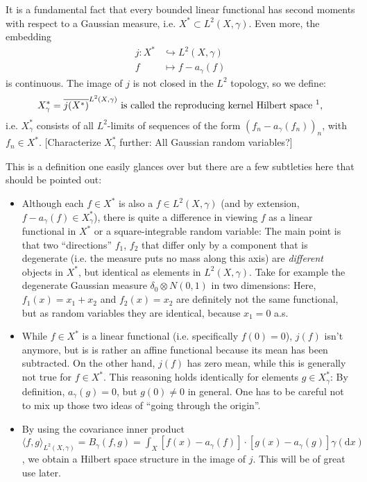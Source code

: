 \documentclass{scrartcl}
\theoremstyle{definition}
\theoremstyle{remark}
\newcommand{\de}{\mathrm d}
\newcommand{\ednote}[1]{{\color{red}[#1]}}
\begin{document}
It is a fundamental fact that every bounded linear functional has second moments with respect to a Gaussian measure, i.e. $X^*\subset L^2(X, \gamma)$. Even more, the embedding
\begin{align*}
j: X^* &\hookrightarrow L^2(X, \gamma)\\
f &\mapsto f - a_\gamma(f)
\end{align*}
is continuous. 
The image of $j$ is not closed in the $L^2$ topology, so we define:
\[ X_\gamma^* = \overline{j(X^*)}^{L^2(X,\gamma)} \text{ is called the reproducing kernel Hilbert space \footnotemark},\]
i.e. $X_\gamma^*$ consists of all $L^2$-limits of sequences of the form $(f_n-a_\gamma(f_n))_n$, with $f_n\in X^*$. \ednote{Characterize $X_\gamma^*$ further: All Gaussian random variables?}

This is a definition one easily glances over but there are a few subtleties here that should be pointed out:
\begin{itemize}
\item Although each $f\in X^*$ is also a $f\in L^2(X, \gamma)$ (and by extension, $f-a_\gamma(f)\in X_\gamma^*$), there is quite a difference in viewing $f$ as a linear functional in $X^*$ or a square-integrable random variable: The main point is that two ``directions'' $f_1$, $f_2$ that differ only by a component that is degenerate (i.e. the measure puts no mass along this axis) are \textit{different} objects in $X^*$, but identical as elements in $L^2(X,\gamma)$. Take for example the degenerate Gaussian measure $\delta_0 \otimes N(0,1)$ in two dimensions: Here, $f_1(x) = x_1+x_2$ and $f_2(x) = x_2$ are definitely not the same functional, but as random variables they are identical, because $x_1 = 0$ a.s.
\item While $f\in X^*$ is a linear functional (i.e. specifically $f(0)=0$), $j(f)$ isn't anymore, but is is rather an affine functional because its mean has been subtracted. On the other hand, $j(f)$ has zero mean, while this is generally not true for $f\in X^*$. This reasoning holds identically for elements $g\in X_\gamma^*$: By definition, $a_\gamma(g) = 0$, but $g(0)\neq 0$ in general. One has to be careful not to mix up those two ideas of ``going through the origin''.
\item By using the covariance inner product $\langle f, g\rangle_{L^2(X, \gamma)} = B_\gamma(f, g) = \int_X [f(x) - a_\gamma(f)]\cdot [g(x)-a_\gamma(g)]\gamma(\de x)$, we obtain a Hilbert space structure in the image of $j$. This will be of great use later. 
\end{itemize}
\end{document}
